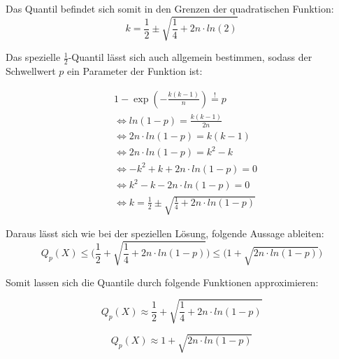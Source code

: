 \documentclass[../main.tex]{subfiles}
\begin{document}
\begin{flushleft}
Das Quantil befindet sich somit in den Grenzen der quadratischen Funktion:
\begin{equation}
 k = \frac{ 1 }{ 2 } \pm \sqrt{ \frac{ 1 }{ 4 } + 2n\cdot ln(2)}
\end{equation}

Das spezielle $ \frac{1}{2} $-Quantil lässt sich auch allgemein bestimmen, sodass der Schwellwert $p$ ein Parameter der Funktion ist:

\begin{align*}
& 1 - \exp(-\frac{ k(k-1) }{ n }) \overset{!}{=} p \\
& \Leftrightarrow ln(1-p) = \frac{ k(k-1)}{ 2n } \\
& \Leftrightarrow 2n\cdot ln(1-p) = k(k-1) \\
& \Leftrightarrow 2n\cdot ln(1-p) = k^{ 2 } - k \\
& \Leftrightarrow - k^{ 2 } + k + 2n\cdot ln(1-p) = 0 \\
& \Leftrightarrow k^{ 2 } - k - 2n\cdot ln(1-p) = 0 \\
& \Leftrightarrow k = \frac{ 1 }{ 2 } \pm \sqrt{ \frac{ 1 }{ 4 } + 2n\cdot ln(1-p)}
\end{align*}

Daraus lässt sich wie bei der speziellen Lösung, folgende Aussage ableiten:
\begin{equation}
Q_{ p }(X) \leq \bigg( \frac{ 1 }{ 2 } + \sqrt{ \frac{ 1 }{ 4 } + 2n\cdot ln(1-p)} \bigg) \leq \bigg(1+\sqrt{ 2n\cdot ln(1-p) }\bigg)
\end{equation}

Somit lassen sich die Quantile durch folgende Funktionen approximieren:

\begin{equation}
Q_{ p }(X) \approx \frac{ 1 }{ 2 } + \sqrt{ \frac{ 1 }{ 4 } + 2n\cdot ln(1-p)}
\end{equation}

\begin{equation}
Q_{ p }(X) \approx 1+\sqrt{ 2n\cdot ln(1-p) }
\end{equation}







\end{flushleft}
\end{document}
